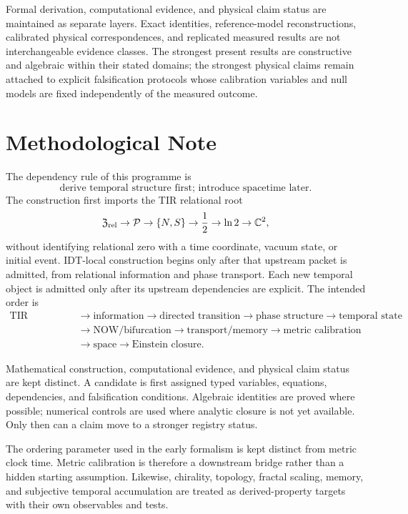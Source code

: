\documentclass[11pt]{book}
\begin{document}
Formal derivation, computational evidence, and physical claim status are maintained as separate layers. Exact identities, reference-model reconstructions, calibrated physical correspondences, and replicated measured results are not interchangeable evidence classes. The strongest present results are constructive and algebraic within their stated domains; the strongest physical claims remain attached to explicit falsification protocols whose calibration variables and null models are fixed independently of the measured outcome.

\chapter*{Methodological Note}

The dependency rule of this programme is
\[
\boxed{\text{derive temporal structure first; introduce spacetime later}.}
\]
The construction first imports the TIR relational root
\[
\mathfrak Z_{\rm rel}
\to\mathcal P
\to\{N,S\}
\to\frac12
\to\ln2
\to\mathbb C^2,
\]
without identifying relational zero with a time coordinate, vacuum state, or initial event. IDT-local construction begins only after that upstream packet is admitted, from relational information and phase transport. Each new temporal object is admitted only after its upstream dependencies are explicit. The intended order is
\[
\begin{aligned}
\text{TIR relational root}
&\to\text{information}
\to\text{directed transition}
\to\text{phase structure}
\to\text{temporal state}\\
&\to\text{NOW/bifurcation}
\to\text{transport/memory}
\to\text{metric calibration}\\
&\to\text{space}
\to\text{Einstein closure}.
\end{aligned}
\]

Mathematical construction, computational evidence, and physical claim status are kept distinct. A candidate is first assigned typed variables, equations, dependencies, and falsification conditions. Algebraic identities are proved where possible; numerical controls are used where analytic closure is not yet available. Only then can a claim move to a stronger registry status.

The ordering parameter used in the early formalism is kept distinct from metric clock time. Metric calibration is therefore a downstream bridge rather than a hidden starting assumption. Likewise, chirality, topology, fractal scaling, memory, and subjective temporal accumulation are treated as derived-property targets with their own observables and tests.
\end{document}
